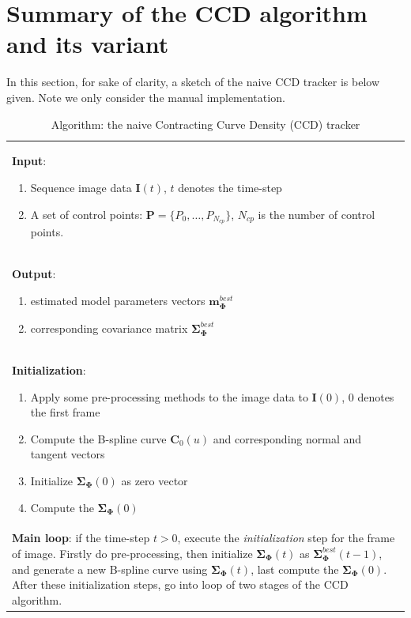 \section{Summary of the CCD algorithm and its variant}
\label{sec:sccd}
In this section,  for sake of clarity, a sketch of the naive CCD
tracker is below given. Note we only consider the manual
implementation.  
\begin{table}[htbp]
  \caption{Algorithm: the naive Contracting Curve Density (CCD) tracker}
  \label{summary of CCD}
  \centering
  \begin{tabular*}{0.9\textwidth}{!{\color{red} \vrule width 4pt}l}
\textbf{Input}:\parbox{13cm}{ 
  \begin{enumerate}
  \item Sequence image data $\mathbf{I}(t)$, $t$ denotes the time-step
  \item A set of control points:  $\mathbf{P} = \{P_{0}, \ldots, P_{N_{cp}}\}$,
$N_{cp}$ is the number of control points.
  \end{enumerate}
}
\\
\textbf{Output}: 
\parbox{13cm}{
  \begin{enumerate}
  \item estimated model parameters vectors $\mathbf{m}_{\mathbf{\Phi}}^{best}$ 
  \item corresponding covariance matrix $\mathbf{\Sigma}_{\mathbf{\Phi}}^{best}$
  \end{enumerate}
}
\\
\textbf{Initialization}:\parbox{13cm}
{
  \begin{enumerate}
  \item Apply some pre-processing methods to the image data to
    $\mathbf{I}(0)$, $0$ denotes the first frame
  \item Compute the B-spline curve $\mathbf{C}_{0}(u)$ and
    corresponding normal and tangent vectors 
  \item Initialize $\mathbf{\Sigma}_{\mathbf{\Phi}}(0)$ as zero vector
  \item Compute the $\mathbf{\Sigma}_{\mathbf{\Phi}}(0)$
  \end{enumerate}
}\\
\textbf{Main loop}: 
\parbox{13cm}
{
if the time-step $t > 0$, execute the \textit{initialization} step for
the frame of image. Firstly do pre-processing, then initialize $\mathbf{\Sigma}_{\mathbf{\Phi}}(t)$ as
$\mathbf{\Sigma}_{\mathbf{\Phi}}^{best}(t-1)$, and generate a new
B-spline curve using $\mathbf{\Sigma}_{\mathbf{\Phi}}(t)$,
last compute the $\mathbf{\Sigma}_{\mathbf{\Phi}}(0)$. After these
initialization steps, go into loop of  two stages of the CCD algorithm.
}\\


\end{tabular*}
\end{table}

